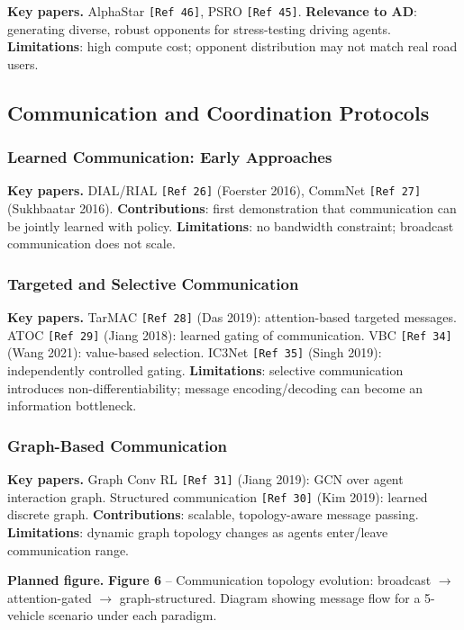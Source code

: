 \documentclass[12pt, a4paper]{article}
\begin{document}
\begin{outline_note}
\textbf{Key papers.}
AlphaStar \texttt{[Ref\,46]}, PSRO \texttt{[Ref\,45]}.
\textbf{Relevance to AD}: generating diverse, robust opponents
for stress-testing driving agents.
\textbf{Limitations}: high compute cost; opponent distribution may
not match real road users.
\end{outline_note}

\subsection{Communication and Coordination Protocols}
\label{sec:comm}

\subsubsection{Learned Communication: Early Approaches}

\begin{outline_note}
\textbf{Key papers.}
DIAL/RIAL \texttt{[Ref\,26]} (Foerster 2016),
CommNet \texttt{[Ref\,27]} (Sukhbaatar 2016).
\textbf{Contributions}: first demonstration that communication can be
jointly learned with policy.
\textbf{Limitations}: no bandwidth constraint; broadcast communication
does not scale.
\end{outline_note}

\subsubsection{Targeted and Selective Communication}

\begin{outline_note}
\textbf{Key papers.}
TarMAC \texttt{[Ref\,28]} (Das 2019): attention-based targeted messages.
ATOC \texttt{[Ref\,29]} (Jiang 2018): learned gating of communication.
VBC \texttt{[Ref\,34]} (Wang 2021): value-based selection.
IC3Net \texttt{[Ref\,35]} (Singh 2019): independently controlled gating.
\textbf{Limitations}: selective communication introduces non-differentiability;
message encoding/decoding can become an information bottleneck.
\end{outline_note}

\subsubsection{Graph-Based Communication}

\begin{outline_note}
\textbf{Key papers.}
Graph Conv RL \texttt{[Ref\,31]} (Jiang 2019): GCN over agent interaction graph.
Structured communication \texttt{[Ref\,30]} (Kim 2019): learned discrete graph.
\textbf{Contributions}: scalable, topology-aware message passing.
\textbf{Limitations}: dynamic graph topology changes as agents enter/leave
communication range.

\textbf{Planned figure.}
\textbf{Figure 6} -- Communication topology evolution: broadcast
$\to$ attention-gated $\to$ graph-structured.  Diagram showing
message flow for a 5-vehicle scenario under each paradigm.
\end{outline_note}
\end{document}
